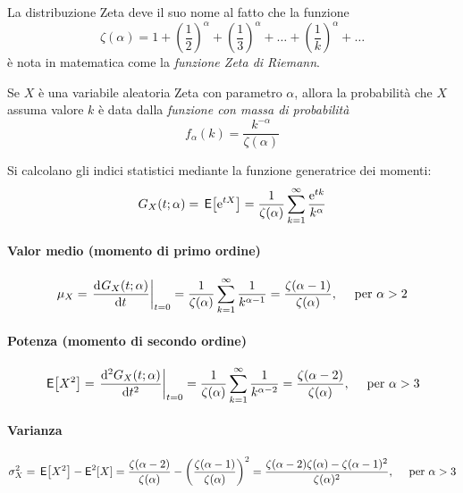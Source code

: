 La distribuzione Zeta deve il suo nome al fatto che la funzione
\[
	\zeta(\alpha) = 1 + \left(\frac{1}{2}\right)^\alpha + \left(\frac{1}{3}\right)^\alpha + \dots + \left(\frac{1}{k}\right)^\alpha + \dots
\]
è nota in matematica come la \emph{funzione Zeta di Riemann}.

Se $X$ è una variabile aleatoria Zeta con parametro $\alpha$, allora la probabilità che $X$ assuma valore $k$ è data dalla \emph{funzione con massa di probabilità}
\begin{equation}
	f_\alpha(k) = \frac{k^{-\alpha}}{\zeta(\alpha)}
\end{equation}

Si calcolano gli indici statistici mediante la funzione generatrice dei momenti:
\begin{equation}
	G_X(t;\alpha) = \,{\operatorname{\mathsf{E}}}\!\left[{\operatorname{e}^{tX}}\right] = \frac{1}{\zeta(\alpha)} \sum_{k=1}^\infty \frac{\operatorname{e}^{tk}}{k^{\alpha}}
\end{equation}

\paragraph{Valor medio (momento di primo ordine)}
\begin{equation}
	\mu_X=\left.{\dfrac{\mathop{}\!\mathrm{d}^{}G_X(t;\alpha)}{\mathop{}\!\mathrm{d} t^{}}}\right\rvert_{t=0}=
	\frac{1}{\zeta(\alpha)}\sum_{k=1}^\infty\frac{1}{k^{\alpha-1}}=
	\frac{\zeta(\alpha-1)}{\zeta(\alpha)},
	\quad\text{ per }\alpha>2
\end{equation}

\paragraph{Potenza (momento di secondo ordine)}
\begin{equation}
	\,{\operatorname{\mathsf{E}}}\!\left[{X^2}\right]=\left.{\frac{\mathrm{d}^2 G_X(t;\alpha)}{\mathrm{d}t^2}}\right\rvert_{t=0}=
	\frac{1}{\zeta(\alpha)}\sum_{k=1}^\infty\frac{1}{k^{\alpha -2}}=
	\frac{\zeta(\alpha -2)}{\zeta(\alpha)},
	\quad\text{ per }\alpha>3
\end{equation}

\paragraph{Varianza}
\begin{equation}
	\sigma_X^2=\,{\operatorname{\mathsf{E}}}\!\left[{X^2}\right]-\operatorname{\mathsf{E}}^2[X]=
	\frac{\zeta(\alpha -2)}{\zeta(\alpha)}-\left(\frac{\zeta(\alpha-1)}{\zeta(\alpha)}\right)^2=
	\frac{\zeta(\alpha-2)\zeta(\alpha)-\zeta(\alpha-1)^2}{\zeta(\alpha)^2},
	\quad\text{ per }\alpha>3
\end{equation}

